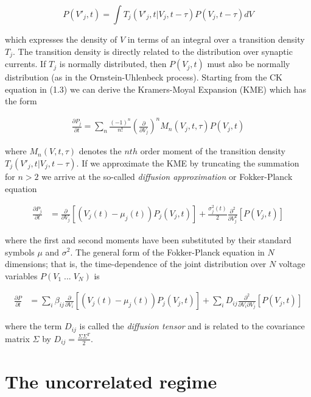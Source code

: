 \documentclass{ucetd}
\begin{document}
\begin{equation}
P(V'_{j}, t) = \int T_{j}(V'_{j}, t | V_{j}, t-\tau)P(V_{j}, t-\tau)dV
\end{equation} 

which expresses the density of $V$ in terms of an integral over a transition density $T_{j}$. The transition density is directly related to the distribution over synaptic currents. If $T_{j}$ is normally distributed, then $P(V_{j},t)$ must also be normally distribution (as in the Ornstein-Uhlenbeck process). Starting from the CK equation in (1.3) we can derive the Kramers-Moyal Expansion (KME) which has the form

\begin{align}
\frac{\partial P_{j}}{\partial t} = \sum_{n} \frac{(-1)^{n}}{n!} \left(\frac{\partial}{\partial V_{j}}\right)^{n} M_{n}(V_{j},t,\tau) P(V_{j},t)
\end{align}

where $M_{n}(V,t,\tau)$ denotes the $nth$ order moment of the transition density $T_{j}(V'_{j}, t | V_{j}, t-\tau)$. If we approximate the KME by truncating the summation for $n > 2$ we arrive at the so-called \emph{diffusion approximation} or Fokker-Planck equation

\begin{align}
\frac{\partial P_{j}}{\partial t} &= \frac{\partial}{\partial V_{j}}[\left(V_{j}(t)-\mu_{j}(t)\right) P_{j}(V_{j},t)] + \frac{\sigma_{j}^{2}(t)}{2}\frac{\partial^{2}}{\partial V_{j}^{2}}[P(V_{j},t)]
\end{align}

where the first and second moments have been substituted by their standard symbols $\mu$ and $\sigma^{2}$. The general form of the Fokker-Planck equation in $N$ dimensions; that is, the time-dependence of the joint distribution over $N$ voltage variables $P(V_{1}\;...\;V_{N})$ is

\begin{align}
\frac{\partial P}{\partial t} &= \sum_{i}
\beta_{ij}\frac{\partial}{\partial V_{i}}[\left(V_{j}(t)-\mu_{j}(t)\right) P_{j}(V_{j},t)] + \sum_{i}D_{ij}\frac{\partial^{2}}{\partial V_{i}\partial V_{j}}[P(V_{j},t)]
\end{align}

where the term $D_{ij}$ is called the \emph{diffusion tensor} and is related to the covariance matrix $\Sigma$ by $D_{ij} = \frac{\Sigma\Sigma^{T}}{2}$.

\section{The uncorrelated regime}
\end{document}
